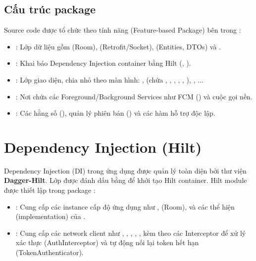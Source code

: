 \subsection{Cấu trúc package}
Source code được tổ chức theo tính năng (Feature-based Package) bên trong :
\begin{itemize}
    \item {}: Lớp dữ liệu gồm  (Room),  (Retrofit/Socket),  (Entities, DTOs) và .
    \item {}: Khai báo Dependency Injection container bằng Hilt (, ).
    \item {}: Lớp giao diện, chia nhỏ theo màn hình: ,  (chứa , , , , , ), , ...
    \item {}: Nơi chứa các Foreground/Background Services như FCM () và cuộc gọi nền.
    \item {}: Các hằng số (), quản lý phiên bản () và các hàm hỗ trợ độc lập.
\end{itemize}


\section{Dependency Injection (Hilt)}
Dependency Injection (DI) trong ứng dụng được quản lý toàn diện bởi thư viện \textbf{Dagger-Hilt}. Lớp  được đánh dấu bằng  để khởi tạo Hilt container.
Hilt module được thiết lập trong package :
\begin{itemize}
    \item {}: Cung cấp các instance cấp độ ứng dụng như ,  (Room), và các thể hiện (implementation) của .
    \item {}: Cung cấp các network client như , , , , , kèm theo các Interceptor để xử lý xác thực (AuthInterceptor) và tự động nối lại token hết hạn (TokenAuthenticator).
\end{itemize}


